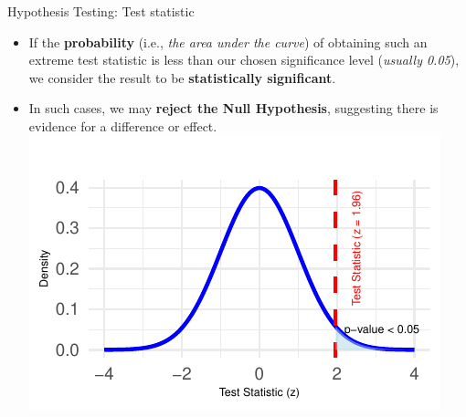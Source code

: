 \documentclass[
  ignorenonframetext,
]{beamer}
\providecommand{\tightlist}{%
  \setlength{\itemsep}{0pt}\setlength{\parskip}{0pt}}
\begin{document}
\begin{frame}{Hypothesis Testing: Test statistic}
\label{hypothesis-testing-test-statistic-2}
\begin{itemize}
\tightlist
\item
  If the \textbf{probability} (i.e., \emph{the area under the curve}) of
  obtaining such an extreme test statistic is less than our chosen
  significance level (\emph{usually 0.05}), we consider the result to be
  \textbf{statistically significant}.
\end{itemize}

\begin{itemize}
\tightlist
\item
  In such cases, we may \textbf{reject the Null Hypothesis}, suggesting
  there is evidence for a difference or effect.
  \includegraphics{M5-Hypothesis-Testing,-Probability-and-Distribution_files/figure-beamer/unnamed-chunk-9-1.pdf}
\end{itemize}
\end{frame}
\end{document}
